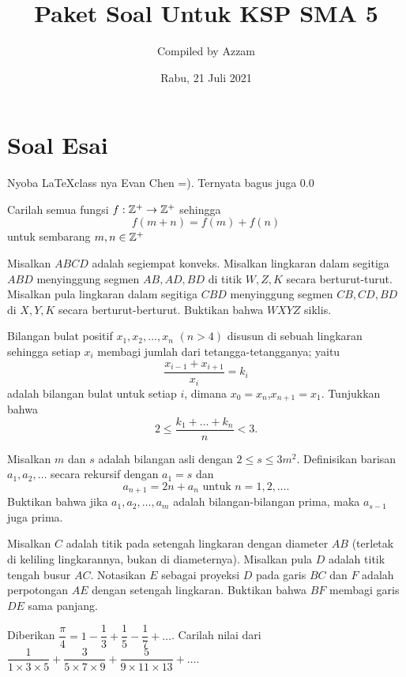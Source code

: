 \documentclass[12pt]{scrartcl}
\begin{document}
	\title{Paket Soal Untuk KSP SMA 5} %
	\date{Rabu, 21 Juli 2021}
	\author{Compiled by Azzam}
	\maketitle

\renewcommand*\contentsname{Daftar Isi}
\tableofcontents

\newpage
	
	
	\section{Soal Esai}
	Nyoba \LaTeX   class nya Evan Chen =). Ternyata bagus juga 0.0
	\begin{soalbaru}
		Carilah semua fungsi $f:\mathbb Z^+ \to \mathbb Z^+$ sehingga $$f(m+n)=f(m)+f(n)$$ untuk sembarang $m,n \in \mathbb Z^+$
	\end{soalbaru}

	\begin{soalbaru}
		Misalkan $ABCD$ adalah segiempat konveks. Misalkan lingkaran dalam segitiga $ABD$ menyinggung segmen $AB,AD,BD$ di titik $W,Z,K$ secara berturut-turut. Misalkan pula lingkaran dalam segitiga $CBD$ menyinggung segmen $CB,CD,BD$ di $X,Y,K$ secara berturut-berturut. Buktikan bahwa $WXYZ$ siklis.
	\end{soalbaru}

	\begin{soalbaru}
		Bilangan bulat positif $x_1,x_2,\dots, x_n$ $(n>4)$ disusun di sebuah lingkaran sehingga setiap $x_i$ membagi jumlah dari tetangga-tetangganya; yaitu 
		$$\dfrac{x_{i-1}+x_{i+1}}{x_{i}}=k_i$$ adalah bilangan bulat untuk setiap $i$, dimana $x_0=x_n$,$x_{n+1}=x_1$. Tunjukkan bahwa 
		$$ 2 \le \dfrac{k_1+\dots+k_n}{n} < 3.$$
	\end{soalbaru}

	\begin{soalbaru}
		Misalkan $m$ dan $s$ adalah bilangan asli dengan $2 \le s \le 3m^2.$ Definisikan barisan $a_1,a_2,\dots$ secara rekursif dengan $a_1=s$ dan $$a_{n+1} = 2n + a_n \text{    untuk   }  n=1,2,\dots.$$
		Buktikan bahwa jika $a_1,a_2,\dots,a_m$ adalah bilangan-bilangan prima, maka $a_{s-1}$ juga prima. 
	\end{soalbaru}
	
	\begin{soalbaru}
	Misalkan $C$ adalah titik pada setengah lingkaran dengan diameter $AB$ (terletak di keliling lingkarannya, bukan di diameternya). Misalkan pula $D$ adalah titik tengah busur $AC$. Notasikan $E$ sebagai proyeksi $D$ pada garis $BC$ dan $F$ adalah perpotongan $AE$ dengan setengah lingkaran. Buktikan bahwa $BF$ membagi garis $DE$ sama panjang.
	\end{soalbaru}
	
	\begin{soalbaru}
	Diberikan $\dfrac{\pi}{4} = 1 - \dfrac{1}{3}+\dfrac{1}{5}-\dfrac{1}{7}+\dots$. Carilah nilai dari $\dfrac{1}{1 \times 3 \times 5}+\dfrac{3}{5 \times 7 \times 9}+\dfrac{5}{9 \times 11 \times 13}+\dots$.
	\end{soalbaru}
\end{document}
